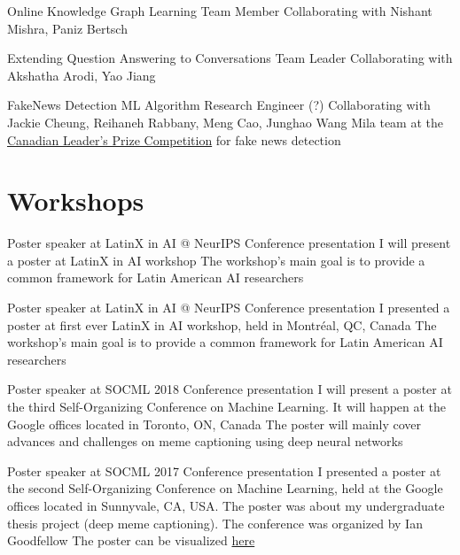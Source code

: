 \documentclass[11pt,a4paper,sans]{moderncv} %
\begin{document}
        {Online Knowledge Graph Learning}
        {Team Member}
        {Collaborating with Nishant Mishra, Paniz Bertsch}
        {}
        {}

        {Extending Question Answering to Conversations}
        {Team Leader}
        {Collaborating with Akshatha Arodi, Yao Jiang}
        {}
        {}

        {FakeNews Detection}
        {ML Algorithm Research Engineer (?)}
        {Collaborating with Jackie Cheung, Reihaneh Rabbany, Meng Cao, Junghao Wang}
        {Mila team at the \href{https://leadersprize.truenorthwaterloo.com/en/}{Canadian Leader's Prize Competition}
         for fake news detection}
        {}

\section{Workshops}

        {Poster speaker at LatinX in AI @ NeurIPS}
        {Conference presentation}
        {I will present a poster at LatinX in AI workshop}
        {The workshop's main goal is to provide a common framework for Latin American AI researchers}
        {}

        {Poster speaker at LatinX in AI @ NeurIPS}
        {Conference presentation}
        {I presented a poster at first ever LatinX in AI workshop, held in Montréal, QC, Canada}
        {The workshop's main goal is to provide a common framework for Latin American AI researchers}
        {}

        {Poster speaker at SOCML 2018}
        {Conference presentation}
        {I will present a poster at the third Self-Organizing Conference on Machine Learning. It will happen at the Google offices located in Toronto, ON, Canada}
        {The poster will mainly cover advances and challenges on meme captioning using deep neural networks}
        {}

        {Poster speaker at SOCML 2017}
        {Conference presentation}
        {I presented a poster at the second Self-Organizing Conference on Machine Learning, held at the Google offices located in Sunnyvale, CA, USA. The poster was about my undergraduate thesis project (deep meme captioning). The conference was organized by Ian Goodfellow}
        {The poster can be visualized \href{https://drive.google.com/file/d/1DPjqiXcmliwPZBOfBIXxnIX_rs9EPUub/view?usp=sharing}{here}}
        {}
\end{document}

